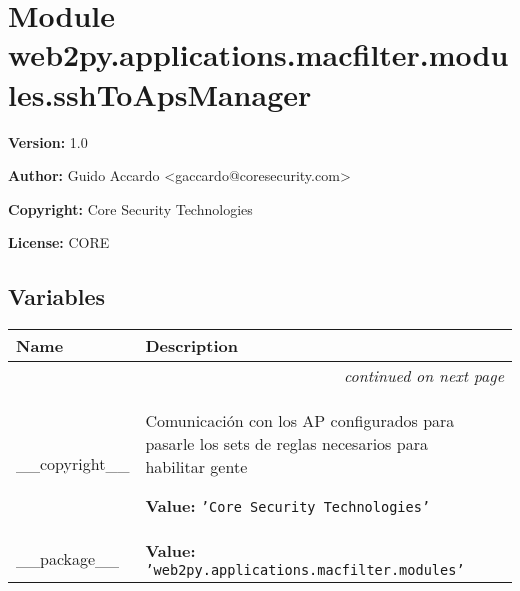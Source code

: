 %
%
%


\section{Module web2py.applications.macfilter.modules.sshToApsManager}

    \label{web2py:applications:macfilter:modules:sshToApsManager}
\textbf{Version:} 1.0



\textbf{Author:} Guido Accardo {\textless}gaccardo@coresecurity.com{\textgreater}



\textbf{Copyright:} Core Security Technologies



\textbf{License:} CORE





  \subsection{Variables}

    \vspace{-1cm}
\hspace{\varindent}\begin{longtable}{|p{\varnamewidth}|p{\vardescrwidth}|l}
\cline{1-2}
\cline{1-2} \centering \textbf{Name} & \centering \textbf{Description}& \\
\cline{1-2}
\endhead\cline{1-2}\multicolumn{3}{r}{\small\textit{continued on next page}}\\\endfoot\cline{1-2}
\endlastfoot\raggedright \_\-\_\-c\-o\-p\-y\-r\-i\-g\-h\-t\-\_\-\_\- & \raggedright Comunicación con los AP configurados para pasarle los sets de 
          reglas necesarios para habilitar gente

\textbf{Value:} 
{\tt \texttt{'}\texttt{Core Security Technologies}\texttt{'}}&\\
\cline{1-2}
\raggedright \_\-\_\-p\-a\-c\-k\-a\-g\-e\-\_\-\_\- & \raggedright \textbf{Value:} 
{\tt \texttt{'}\texttt{web2py.applications.macfilter.modules}\texttt{'}}&\\
\cline{1-2}
\end{longtable}


